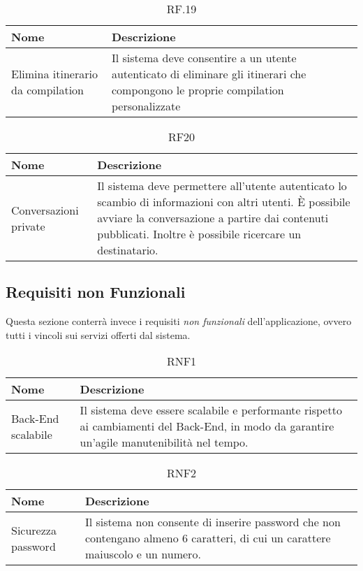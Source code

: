 \documentclass{natourDoc}
\begin{document}
	\begin{table}[H]
		\centering
		\begin{tabular}{ |p{5cm}|p{10.3cm}| }
			\hline
			\rowcolor{PineGreen!70}
			\textbf{Nome} & \textbf{Descrizione} \\
			\hline
			Elimina itinerario da compilation & Il sistema deve consentire a un utente autenticato di eliminare gli itinerari
			che compongono le proprie compilation personalizzate \\
			\hline
		\end{tabular}
		\caption{RF.19}
		\label{table:19}
	\end{table}

	\begin{table}[H]
		\centering
		\begin{tabular}{ |p{5cm}|p{10.3cm}| }
			\hline
			\rowcolor{PineGreen!70}
			\textbf{Nome} & \textbf{Descrizione} \\
			\hline
			Conversazioni private & Il sistema deve permettere all'utente autenticato lo scambio di informazioni con altri utenti.
			È possibile avviare la conversazione a partire dai contenuti pubblicati. Inoltre è possibile ricercare un destinatario. \\
			\hline
		\end{tabular}
		\caption{RF20}
		\label{table:20}
	\end{table}

	\newpage

	\subsection{Requisiti non Funzionali}
	Questa sezione conterrà invece i requisiti \textit{non funzionali} dell'applicazione, ovvero tutti i vincoli sui servizi offerti dal sistema.

	\begin{table}[H]
		\centering
		\begin{tabular}{ |p{5cm}|p{10.3cm}| } 
			\hline
			\rowcolor{PineGreen!70}
			\textbf{Nome} & \textbf{Descrizione} \\
			\hline
			Back-End scalabile & Il sistema deve essere scalabile e performante rispetto ai cambiamenti del Back-End,
			in modo da garantire un'agile manutenibilità nel tempo. \\
			\hline
		\end{tabular}
		\caption{RNF1}
		\label{table:21}
	\end{table}
	
	\begin{table}[H]
		\centering
		\begin{tabular}{ |p{5cm}|p{10.3cm}| } 
			\hline
			\rowcolor{PineGreen!70}
			\textbf{Nome} & \textbf{Descrizione} \\
			\hline
			Sicurezza password & Il sistema non consente di inserire password che non contengano 
			almeno 6 caratteri, di cui un carattere maiuscolo e un numero.\\
			\hline
		\end{tabular}
		\caption{RNF2}
		\label{table:22}
	\end{table}
\end{document}
